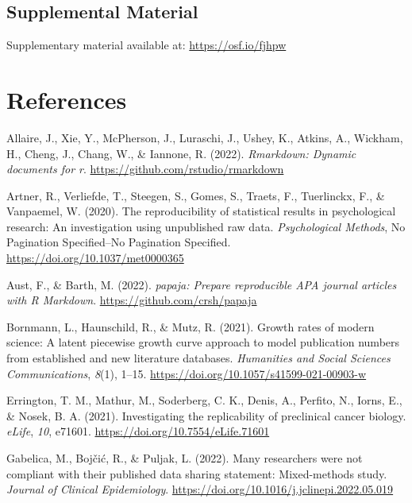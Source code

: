 \documentclass[
  ,apa7,floatsintext]{apa6}
\newlength{\cslhangindent}
\newlength{\cslentryspacingunit} %
\newenvironment{CSLReferences}[2] %
 {%
  \setlength{\parindent}{0pt}
  \ifodd #1
  \let\oldpar\par
  \def\par{\hangindent=\cslhangindent\oldpar}
  \fi
  \setlength{\parskip}{#2\cslentryspacingunit}
 }%
 {}
\begin{document}
\hypertarget{supplemental-material}{%
\subsection{Supplemental Material}\label{supplemental-material}}

Supplementary material available at: \url{https://osf.io/fjhpw}

\hypertarget{references}{%
\section*{References}\label{references}}

\hypertarget{refs}{}
\begin{CSLReferences}{1}{0}
\leavevmode{}%
Allaire, J., Xie, Y., McPherson, J., Luraschi, J., Ushey, K., Atkins, A., Wickham, H., Cheng, J., Chang, W., \& Iannone, R. (2022). \emph{Rmarkdown: Dynamic documents for r}. \url{https://github.com/rstudio/rmarkdown}

\leavevmode{}%
Artner, R., Verliefde, T., Steegen, S., Gomes, S., Traets, F., Tuerlinckx, F., \& Vanpaemel, W. (2020). The reproducibility of statistical results in psychological research: {An} investigation using unpublished raw data. \emph{Psychological Methods}, No Pagination Specified--No Pagination Specified. \url{https://doi.org/10.1037/met0000365}

\leavevmode{}%
Aust, F., \& Barth, M. (2022). \emph{{papaja}: {Prepare} reproducible {APA} journal articles with {R Markdown}}. \url{https://github.com/crsh/papaja}

\leavevmode{}%
Bornmann, L., Haunschild, R., \& Mutz, R. (2021). Growth rates of modern science: A latent piecewise growth curve approach to model publication numbers from established and new literature databases. \emph{Humanities and Social Sciences Communications}, \emph{8}(1), 1--15. \url{https://doi.org/10.1057/s41599-021-00903-w}

\leavevmode{}%
Errington, T. M., Mathur, M., Soderberg, C. K., Denis, A., Perfito, N., Iorns, E., \& Nosek, B. A. (2021). Investigating the replicability of preclinical cancer biology. \emph{eLife}, \emph{10}, e71601. \url{https://doi.org/10.7554/eLife.71601}

\leavevmode{}%
Gabelica, M., Bojčić, R., \& Puljak, L. (2022). Many researchers were not compliant with their published data sharing statement: Mixed-methods study. \emph{Journal of Clinical Epidemiology}. \url{https://doi.org/10.1016/j.jclinepi.2022.05.019}


\end{CSLReferences}
\end{document}
